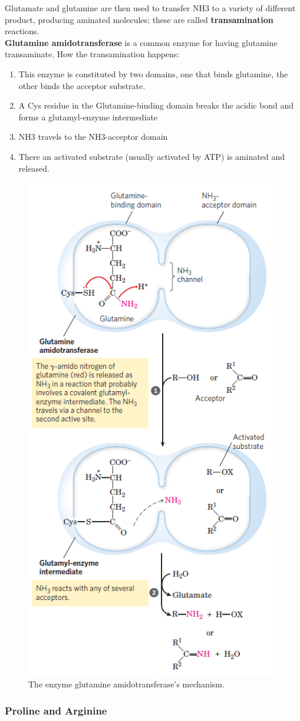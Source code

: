 \documentclass[../main.tex]{subfiles}
\begin{document}
Glutamate and glutamine are then used to transfer NH3 to a variety of different product, producing aminated molecules; these are called \textbf{\gls{transamination}} reactions. \\

\textbf{\gls{Glutamine amidotransferase}} is a common enzyme for having glutamine transaminate. How the transamination happens:
\begin{enumerate}
	\item This enzyme is constituted by two domains, one that binds glutamine, the other binds the acceptor substrate.
	\item A Cys residue in the Glutamine-binding domain breaks the acidic bond and forms a glutamyl-enzyme intermediate
	\item NH3 travels to the NH3-acceptor domain
	\item There an activated substrate (usually activated by ATP) is aminated and released.
\end{enumerate}
\begin{figure}[H]
	\centering
	\includegraphics[width=0.5\linewidth]{nit_enz}
	\caption{The enzyme glutamine amidotransferase's mechanism.}
	\label{fig:nitenz}
\end{figure}


\subsubsection{Proline and Arginine}
\end{document}
